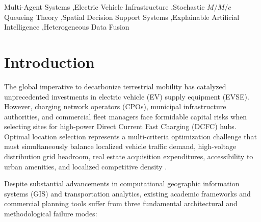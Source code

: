 \documentclass[preprint,12pt,authoryear]{elsarticle}
\begin{document}
\begin{frontmatter}
\begin{abstract}
The complete architecture was containerized, deployed on Google Cloud Run, and validated via a 56-check automated production benchmark suite across ten diverse global metropolitan cities spanning five continents. In comparative empirical evaluations against a 25,000-session Monte Carlo discrete-event simulation ground truth, the proposed $M/M/c$ model achieves a tail wait-time Mean Absolute Error (MAE) of 9.39 minutes, outperforming lumped $M/M/1$ approximations (13.67 min MAE, a 45.6\% error reduction) and static planning heuristics (38.45 min MAE, a 309.4\% error reduction). Furthermore, our multi-attribute utility matrix enhances available electrical grid headroom by $+17.3\%$ and reduces competitive cluster overlap by $-35.3\%$ relative to conventional greedy commercial point-of-interest (POI) density heuristics. The engine delivers sub-second median discovery response latencies ($p_{50} = 880\text{ ms}$) with zero hardcoded geographic metadata.
\end{abstract}

\begin{keyword}
Multi-Agent Systems \sep Electric Vehicle Infrastructure \sep Stochastic $M/M/c$ Queueing Theory \sep Spatial Decision Support Systems \sep Explainable Artificial Intelligence \sep Heterogeneous Data Fusion
\end{keyword}

\end{frontmatter}

\section{Introduction}
\label{sec:intro}
The global imperative to decarbonize terrestrial mobility has catalyzed unprecedented investments in electric vehicle (EV) supply equipment (EVSE). However, charging network operators (CPOs), municipal infrastructure authorities, and commercial fleet managers face formidable capital risks when selecting sites for high-power Direct Current Fast Charging (DCFC) hubs. Optimal location selection represents a multi-criteria optimization challenge that must simultaneously balance localized vehicle traffic demand, high-voltage distribution grid headroom, real estate acquisition expenditures, accessibility to urban amenities, and localized competitive density \citep{chen2024spatial, zhang2023multiagent}.

Despite substantial advancements in computational geographic information systems (GIS) and transportation analytics, existing academic frameworks and commercial planning tools suffer from three fundamental architectural and methodological failure modes:
\end{document}
